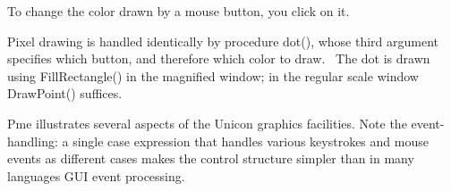
To change the color drawn by a mouse button, you click on it.


Pixel drawing is handled identically by procedure dot(), whose third
argument specifies which button, and therefore which color to draw.
\ The dot is drawn using FillRectangle() in the magnified window; in
the regular scale window DrawPoint() suffices.


Pme illustrates several aspects of the Unicon graphics facilities. Note
the event-handling: a single case expression that handles various
keystrokes and mouse events as different cases makes the control
structure simpler than in many languages{\textquotesingle} GUI event
processing.

